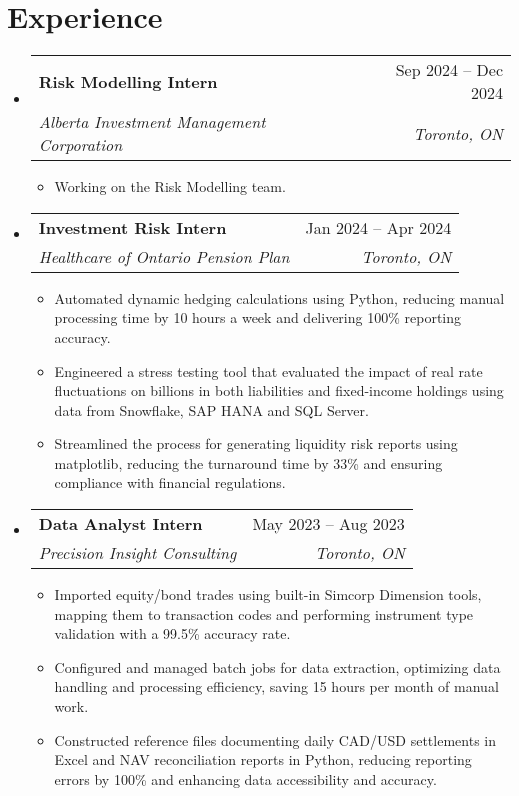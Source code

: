\documentclass[letterpaper,11pt]{article}
\makeatletter
\newcommand{\resumeItem}[1]{
  \item\small{
    {#1 \vspace{-2pt}}
  }
}
\newcommand{\resumeSubheading}[4]{
  \vspace{-2pt}\item
    \begin{tabular*}{0.97\textwidth}[t]{l@{\extracolsep{\fill}}r}
      \textbf{#1} & #2 \\
      \textit{\small#3} & \textit{\small #4} \\
    \end{tabular*}\vspace{-7pt}
}
\newcommand{\resumeSubHeadingListStart}{\begin{itemize}[leftmargin=0.15in, label={}]}
\newcommand{\resumeSubHeadingListEnd}{\end{itemize}}
\newcommand{\resumeItemListStart}{\begin{itemize}}
\newcommand{\resumeItemListEnd}{\end{itemize}\vspace{-5pt}}
\makeatother
\begin{document}
\section{Experience}
\resumeSubHeadingListStart

  \resumeSubheading
    {Risk Modelling Intern}{Sep 2024 -- Dec 2024}
    {Alberta Investment Management Corporation}{Toronto, ON}
  \resumeItemListStart
  
    \resumeItem{Working on the Risk Modelling team.}
  
  \resumeItemListEnd

  \resumeSubheading
    {Investment Risk Intern}{Jan 2024 -- Apr 2024}
    {Healthcare of Ontario Pension Plan}{Toronto, ON}
  \resumeItemListStart

    \resumeItem{Automated dynamic hedging calculations using Python, reducing manual processing 
    time by 10 hours a week and delivering 100\% reporting accuracy.}
    
    \resumeItem{Engineered a stress testing tool that evaluated the impact of real rate fluctuations 
    on billions in both liabilities and fixed-income holdings using data from Snowflake, SAP HANA and SQL Server.}
    
    \resumeItem{Streamlined the process for generating liquidity risk reports using matplotlib, 
    reducing the turnaround time by 33\% and ensuring compliance with financial regulations.}
  
  \resumeItemListEnd

  \resumeSubheading
    {Data Analyst Intern}{May 2023 -- Aug 2023}
    {Precision Insight Consulting}{Toronto, ON}
  \resumeItemListStart

    \resumeItem{Imported equity/bond trades using built-in Simcorp Dimension tools, mapping them to transaction 
    codes and performing instrument type validation with a 99.5\% accuracy rate.}

    \resumeItem{Configured and managed batch jobs for data extraction, 
    optimizing data handling and processing efficiency, saving 15 hours per month of manual work.}

    \resumeItem{Constructed reference files documenting daily CAD/USD settlements in Excel and 
    NAV reconciliation reports in Python, reducing reporting errors by 100\% and enhancing data accessibility and accuracy.}

  \resumeItemListEnd

\resumeSubHeadingListEnd
\end{document}
